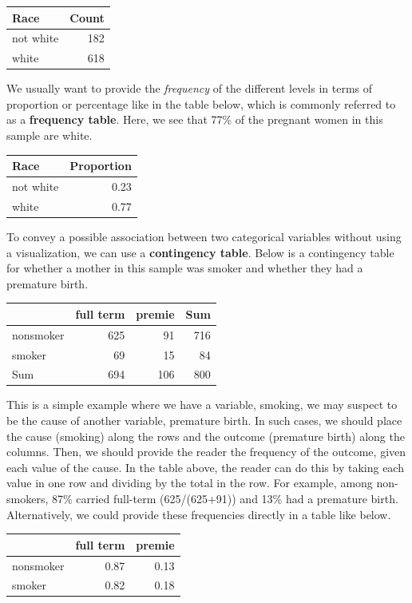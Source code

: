 \documentclass[
]{book}
\begin{document}
\begin{tabular}{l|r}
\hline
Race & Count\\
\hline
not white & 182\\
\hline
white & 618\\
\hline
\end{tabular}

We usually want to provide the \emph{frequency} of the different levels in terms of proportion or percentage like in the table below, which is commonly referred to as a \textbf{frequency table}. Here, we see that 77\% of the pregnant women in this sample are white.

\begin{tabular}{l|r}
\hline
Race & Proportion\\
\hline
not white & 0.23\\
\hline
white & 0.77\\
\hline
\end{tabular}

To convey a possible association between two categorical variables without using a visualization, we can use a \textbf{contingency table}. Below is a contingency table for whether a mother in this sample was smoker and whether they had a premature birth.

\begin{tabular}{l|r|r|r}
\hline
  & full term & premie & Sum\\
\hline
nonsmoker & 625 & 91 & 716\\
\hline
smoker & 69 & 15 & 84\\
\hline
Sum & 694 & 106 & 800\\
\hline
\end{tabular}

This is a simple example where we have a variable, smoking, we may suspect to be the cause of another variable, premature birth. In such cases, we should place the cause (smoking) along the rows and the outcome (premature birth) along the columns. Then, we should provide the reader the frequency of the outcome, given each value of the cause. In the table above, the reader can do this by taking each value in one row and dividing by the total in the row. For example, among non-smokers, 87\% carried full-term (625/(625+91)) and 13\% had a premature birth. Alternatively, we could provide these frequencies directly in a table like below.

\begin{tabular}{l|r|r}
\hline
  & full term & premie\\
\hline
nonsmoker & 0.87 & 0.13\\
\hline
smoker & 0.82 & 0.18\\
\hline
\end{tabular}
\end{document}
